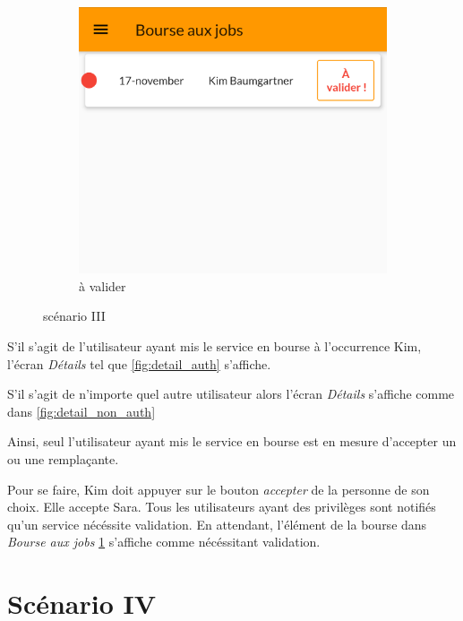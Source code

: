 \begin{figure}[!h]
\begin{subfigure}{.3\textwidth}
        \end{subfigure}
        \begin{subfigure}{.3\textwidth}
            \centering
            \includegraphics[width=0.9\linewidth]{screenshots/scenario_03/a_valider.png}
            \caption{à valider}
            \label{fig:a_valider}
        \end{subfigure}
        \caption{scénario III}
        \label{fig:scen03}
    \end{figure}

    S'il s'agit de l'utilisateur ayant mis le service en bourse à l'occurrence Kim, l'écran \textit{Détails} tel que \ref{fig:detail_auth} s'affiche.
    
    S'il s'agit de n'importe quel autre utilisateur alors l'écran \textit{Détails} s'affiche comme dans \ref{fig:detail_non_auth}

    Ainsi, seul l'utilisateur ayant mis le service en bourse est en mesure d'accepter un ou une remplaçante. 
    
    Pour se faire, Kim doit appuyer sur le bouton \textit{accepter} de la personne de son choix.
    Elle accepte Sara. Tous les utilisateurs ayant des privilèges sont notifiés qu'un service nécéssite validation.
    En attendant, l'élément de la bourse dans \textit{Bourse aux jobs} \ref{fig:a_valider} s'affiche comme nécéssitant validation.

\section[Valider un échange - Scénario IV]{Scénario IV}
